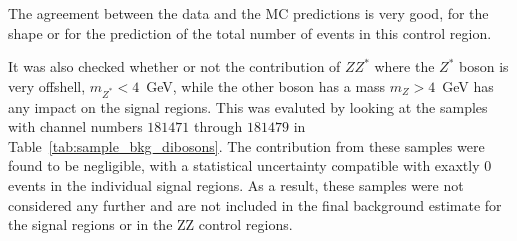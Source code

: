 The agreement between the data and the MC predictions is very good, for the shape or for the prediction of the total number of events in this control region.

It was also checked whether or not the contribution of $ZZ^{*}$ where the $Z^{*}$ boson is very offshell, $m_{Z^{*}} < 4$~GeV, while the other boson
has a  mass $m_Z > 4$~GeV has any impact on the signal regions. This was evaluted by looking at the samples with channel numbers
$181471$ through $181479$ in Table~\ref{tab:sample_bkg_dibosons}.  The contribution from these samples were found to be negligible, with a statistical
uncertainty compatible with exaxtly 0 events in the individual signal regions. As a result, these samples were not considered any further and are not
included in the final background  estimate for the signal regions or in the ZZ control regions.


